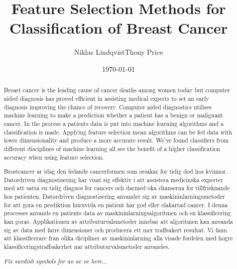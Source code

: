 \documentclass{kththesis}
\title{Feature Selection Methods for Classification of Breast Cancer}
\author{Niklas Lindqvist\newline Thony Price}
\date{\today}
\begin{document}
\frontmatter
\titlepage



\begin{abstract}

  Breast cancer is the leading cause of cancer deaths among women today but computer aided diagnosis has proved efficient in assisting medical experts to set an early diagnosis improving the chance of recovery. Computer aided diagnostics utilises machine learning to make a prediction whether a patient has a benign or malignant cancer. In the process a patients data is put into machine learning algorithms and a classification is made. Applying feature selection mean algorithms can be fed data with lower dimensionality and produce a more accurate result. We've found classifiers from different disciplines of machine learning all see the benefit of a higher classification accuracy when using feature selection.

\end{abstract}



\begin{otherlanguage}{swedish}
  \begin{abstract}

  Brostcancer ar idag den ledande cancerformen som orsakar for tidig dod hos kvinnor. Datordriven diagnostisering har visat sig effektiv i att assistera medicinska experter med att satta en tidig diagnos for cancers och darmed oka chanserna for tillfrisknande hos patienten. Datordriven diagnostisering anvander sig av maskininlarningsmetoder for att gora en prediktion huruvida en patient har god eller elakartad cancer. I denna processes anvands en patients data av maskininlarningsalgoritmen och en klassificering kan goras. Applikationen av attributurvalsmetoder innebar att algoritmen kan anvanda sig av data med farre dimensioner och producera ett mer traffsakert resultat. Vi fann att klassificerare fran olika dicipliner av maskininlarning alla visade fordelen med hogre klassificeringstraffsakerhet nar attributurvalsmetoder anvandes.

  \textit{Fix swedish symbols for ao ae oe here...}

  \end{abstract}

\end{otherlanguage}


\tableofcontents
\mainmatter
\end{document}
